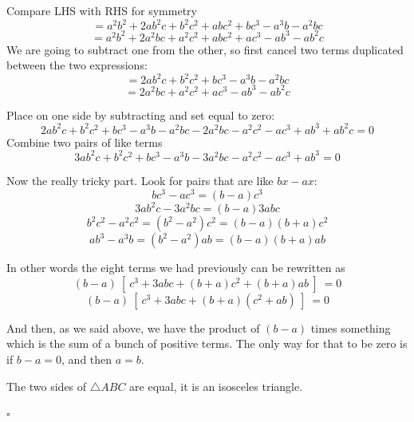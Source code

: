 \documentclass[11pt, oneside]{article}
\begin{document}
Compare LHS with RHS for symmetry
\[ = a^2b^2 + 2ab^2c + b^2c^2 + abc^2 + bc^3 - a^3b - a^2bc \]
\[ = a^2b^2 + 2a^2bc + a^2c^2 + abc^2 + ac^3 - ab^3 - ab^2c \]
We are going to subtract one from the other, so first cancel two terms duplicated between the two expressions:
\[ = 2ab^2c + b^2c^2 + bc^3 - a^3b - a^2bc \]
\[ = 2a^2bc + a^2c^2 + ac^3 - ab^3 - ab^2c \]

Place on one side by subtracting and set equal to zero:
\[ 2ab^2c + b^2c^2 + bc^3 - a^3b - a^2bc - 2a^2bc - a^2c^2 - ac^3 + ab^3 + ab^2c = 0 \]
Combine two pairs of like terms
\[ 3ab^2c + b^2c^2 + bc^3 - a^3b - 3a^2bc - a^2c^2 - ac^3 + ab^3 = 0 \]

Now the really tricky part.  Look for pairs that are like $bx-ax$:
\[ bc^3 - ac^3 = (b-a)c^3 \]
\[ 3ab^2c - 3a^2bc = (b-a)3abc \]
\[ b^2c^2 - a^2c^2 = (b^2 - a^2)c^2 = (b-a)(b+a)c^2  \]
\[  ab^3 - a^3b = (b^2 - a^2)ab = (b-a)(b+a)ab \]

In other words the eight terms we had previously can be rewritten as
\[ (b-a) \ [ \ c^3 + 3abc + (b+a)c^2 + (b+a)ab \ ] \ = 0 \]
\[ (b-a) \ [ \ c^3 + 3abc + (b+a)(c^2 + ab) \ ] \ = 0 \]

And then, as we said above, we have the product of $(b-a)$ times something which is the sum of a bunch of positive terms.  The only way for that to be zero is if $b - a = 0$, and then $a = b$.

The two sides of $\triangle ABC$ are equal, it is an isosceles triangle.

$\square$
\end{document}
